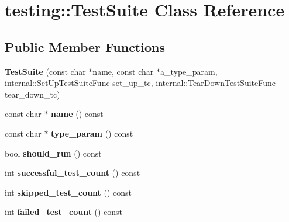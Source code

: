 \hypertarget{classtesting_1_1TestSuite}{}\section{testing\+:\+:Test\+Suite Class Reference}
\label{classtesting_1_1TestSuite}
\subsection*{Public Member Functions}
\begin{DoxyCompactItemize}
\item 
\mbox{\label{classtesting_1_1TestSuite_a2d6469bcb83701e1bbfe47c465e9731f}} 
{\bfseries Test\+Suite} (const char $\ast$name, const char $\ast$a\+\_\+type\+\_\+param, internal\+::\+Set\+Up\+Test\+Suite\+Func set\+\_\+up\+\_\+tc, internal\+::\+Tear\+Down\+Test\+Suite\+Func tear\+\_\+down\+\_\+tc)
\item 
\mbox{\label{classtesting_1_1TestSuite_ab3369db678ca3d9648d6fd63ad038986}} 
const char $\ast$ {\bfseries name} () const
\item 
\mbox{\label{classtesting_1_1TestSuite_ab2ea12318bdbfb6aa97792344b49e3db}} 
const char $\ast$ {\bfseries type\+\_\+param} () const
\item 
\mbox{\label{classtesting_1_1TestSuite_a8f62c17baef80042e0ff03ef5d5e4ba7}} 
bool {\bfseries should\+\_\+run} () const
\item 
\mbox{\label{classtesting_1_1TestSuite_a85bc4191681df7e8bae810c1744465ec}} 
int {\bfseries successful\+\_\+test\+\_\+count} () const
\item 
\mbox{\label{classtesting_1_1TestSuite_ae48c72ff92fa1c555e3b577f8661285c}} 
int {\bfseries skipped\+\_\+test\+\_\+count} () const
\item 
\mbox{\label{classtesting_1_1TestSuite_aaf18223e67cf0761f56bd4b8167abc6c}} 
int {\bfseries failed\+\_\+test\+\_\+count} () const
\item 
\mbox{\label{classtesting_1_1TestSuite_ab0b3d1ee8efaa18ceb2553a71002c678}} 

\end{DoxyCompactItemize}
